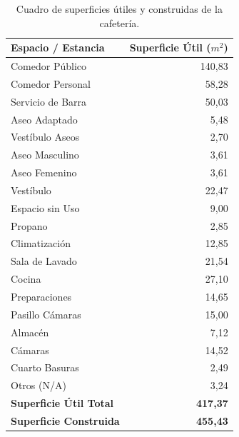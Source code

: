 \begin{table}[htbp]
    \centering
    \caption{Cuadro de superficies útiles y construidas de la cafetería.}
    \label{tab:superficies}
    \begin{tabular}{lr}
        \toprule
        \textbf{Espacio / Estancia} & \textbf{Superficie Útil ($m^2$)} \\
        \midrule
        Comedor Público & 140,83 \\
        Comedor Personal & 58,28 \\
        Servicio de Barra & 50,03 \\
        Aseo Adaptado & 5,48 \\
        Vestíbulo Aseos & 2,70 \\
        Aseo Masculino & 3,61 \\
        Aseo Femenino & 3,61 \\
        Vestíbulo & 22,47 \\
        Espacio sin Uso & 9,00 \\
        Propano & 2,85 \\
        Climatización & 12,85 \\
        Sala de Lavado & 21,54 \\
        Cocina & 27,10 \\
        Preparaciones & 14,65 \\
        Pasillo Cámaras & 15,00 \\
        Almacén & 7,12 \\
        Cámaras & 14,52 \\
        Cuarto Basuras & 2,49 \\
        Otros (N/A) & 3,24 \\
        \midrule
        \textbf{Superficie Útil Total} & \textbf{417,37} \\
        \textbf{Superficie Construida} & \textbf{455,43} \\
        \bottomrule
    \end{tabular}
\end{table}
